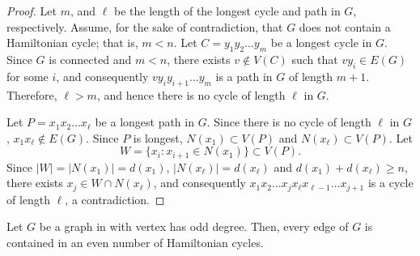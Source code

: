 \begin{proof}
    Let \(m\), and \(\ell\) be the length of the longest cycle and path in \(G\), respectively.
    Assume, for the sake of contradiction, that \(G\) does not contain a Hamiltonian cycle;
    that is, \(m < n\).
    Let \(C = y_1y_2 \ldots y_{m}\) be a longest cycle in \(G\).
    Since \(G\) is connected and \(m < n\), there exists \(v \notin V(C)\) such that \(vy_i \in E(G)\) for some \(i\),
    and consequently \(v y_i y_{i+1} \ldots y_{m}\) is a path in \(G\) of length \(m + 1\).
    Therefore, \(\ell > m\), and hence there is no cycle of length \(\ell\) in \(G\).

    Let \(P = x_1x_2 \ldots x_\ell\) be a longest path in \(G\).
    Since there is no cycle of length \(\ell\) in \(G\), \(x_1x_\ell \not\in E(G)\).
    Since \(P\) is longest, \(N(x_1) \subset V(P)\) and \(N(x_\ell) \subset V(P)\).
    Let 
    \begin{equation}
        W = \{x_i : x_{i+1} \in N(x_1)\} \subset V(P).
    \end{equation}
    Since \(|W| = |N(x_1)| = d(x_1)\), \(|N(x_\ell)| = d(x_\ell)\) and \(d(x_1) + d(x_\ell) \geq n\),
    there exists \(x_j \in W \cap N(x_\ell)\),
    and consequently \(x_1x_2 \ldots x_j x_\ell x_{\ell-1} \ldots x_{j+1}\) is a cycle of length \(\ell\), a contradiction.
\end{proof}

\begin{theorem}[Thomason] \label{thm:thomason}
    Let \(G\) be a graph in with vertex has odd degree.
    Then, every edge of \(G\) is contained in an even number of Hamiltonian cycles.
\end{theorem}

